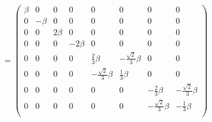 \begin{align*}
    [H'_{Z}] = \begin{pmatrix}
        \beta & 0 & 0 & 0 &0 &0 & 0 & 0\\
        0 & -\beta & 0 & 0 &0 &0 & 0& 0\\
        0 & 0 & 2\beta & 0 &0 &0 & 0& 0\\
        0 & 0 & 0 & -2\beta &0 &0 & 0& 0\\
        0 & 0 & 0 & 0 &\frac{2}{3}\beta &-\frac{\sqrt{2}}{3}\beta & 0& 0\\
        0 & 0 & 0 & 0 &-\frac{\sqrt{2}}{3}\beta &\frac{1}{3}\beta & 0& 0\\
        0 & 0 & 0 & 0 &0 &0 & -\frac{2}{3}\beta& -\frac{\sqrt{2}}{3}\beta\\
        0 & 0 & 0 & 0 &0 &0 & -\frac{\sqrt{2}}{3}\beta& -\frac{1}{3}\beta\\
    \end{pmatrix}
\end{align*}


